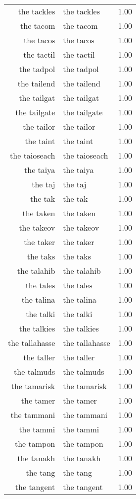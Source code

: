 \begin{table}[ht]
\begin{tabular}{rlr}
  the tackles & the tackles & 1.00 \\ 
  the tacom & the tacom & 1.00 \\ 
  the tacos & the tacos & 1.00 \\ 
  the tactil & the tactil & 1.00 \\ 
  the tadpol & the tadpol & 1.00 \\ 
  the tailend & the tailend & 1.00 \\ 
  the tailgat & the tailgat & 1.00 \\ 
  the tailgate & the tailgate & 1.00 \\ 
  the tailor & the tailor & 1.00 \\ 
  the taint & the taint & 1.00 \\ 
  the taioseach & the taioseach & 1.00 \\ 
  the taiya & the taiya & 1.00 \\ 
  the taj & the taj & 1.00 \\ 
  the tak & the tak & 1.00 \\ 
  the taken & the taken & 1.00 \\ 
  the takeov & the takeov & 1.00 \\ 
  the taker & the taker & 1.00 \\ 
  the taks & the taks & 1.00 \\ 
  the talahib & the talahib & 1.00 \\ 
  the tales & the tales & 1.00 \\ 
  the talina & the talina & 1.00 \\ 
  the talki & the talki & 1.00 \\ 
  the talkies & the talkies & 1.00 \\ 
  the tallahasse & the tallahasse & 1.00 \\ 
  the taller & the taller & 1.00 \\ 
  the talmuds & the talmuds & 1.00 \\ 
  the tamarisk & the tamarisk & 1.00 \\ 
  the tamer & the tamer & 1.00 \\ 
  the tammani & the tammani & 1.00 \\ 
  the tammi & the tammi & 1.00 \\ 
  the tampon & the tampon & 1.00 \\ 
  the tanakh & the tanakh & 1.00 \\ 
  the tang & the tang & 1.00 \\ 
  the tangent & the tangent & 1.00 \\ 

\end{tabular}
\end{table}
